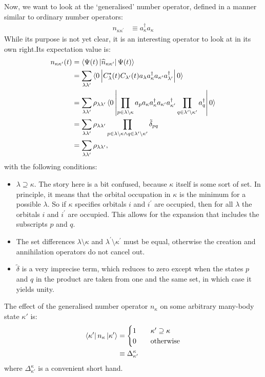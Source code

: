 Now, we want to look at the `generalised' number operator, defined in a manner similar to ordinary number operators: 
\begin{align}
n_{\kappa\kappa^\prime} &\equiv a^\dagger_\kappa a_\kappa \label{eq:gennum}
\end{align}
While its purpose is not yet clear, it is an interesting operator to look at in its own right.Its expectation value is:
\begin{align*}
n_{\kappa\kappa^\prime} (t) &= \braket{\Psi (t) \left| \widehat{n}_{\kappa\kappa^\prime}\right|\Psi (t)} \\
&=\sum_{\lambda\lambda^\prime} \braket{0\left| C_\lambda^\star (t) C_{\lambda^\prime} (t) a_\lambda a_\kappa^\dagger a_{\kappa^\prime} a_{\lambda^\prime}^\dagger \right|0}
\\
&= \sum_{\lambda\lambda^\prime} \rho_{\lambda\lambda^\prime} \braket{0\left| \prod_{p \in \lambda\setminus{\kappa}} a_p a_\kappa a_\kappa^\dagger a_{\kappa^\prime} a_{\kappa^\prime}^\dagger \prod_{q \in \lambda^\prime\setminus{\kappa^\prime}}a_q^\dagger \right|0}
\\
&= \sum_{\lambda\lambda^\prime} \rho_{\lambda\lambda^\prime} \prod_{p \in \lambda\setminus{\kappa} \wedge q \in \lambda^\prime\setminus{\kappa^\prime}} \tilde{\delta}_{pq}
\\
&=  \sum_{\lambda\lambda^\prime} \rho_{\lambda\lambda^\prime},
\end{align*}with the following conditions:
\begin{itemize}
\item $\lambda\supseteq\kappa$. The story here is a bit confused, because $\kappa$ itself is some sort of set. In principle, it means that the orbital occupation in $\kappa$ is the minimum for a possible $\lambda$. So if $\kappa$ specifies orbitals $i$ and $i^\prime$ are occupied, then for all $\lambda$ the orbitals $i$ and $i^\prime$ are occupied. This allows for the expansion that includes the subscripts $p$ and $q$.
\item The set differences $\lambda\setminus{\kappa}$ and $\lambda^\prime\setminus{\kappa^\prime}$ must be equal, otherwise the creation and annihilation operators do not cancel out. 
\item $\tilde{\delta}$ is a very imprecise term, which reduces to zero except when the states $p$ and $q$ in the product are taken from one and the same set, in which case it yields unity.
\end{itemize}

The effect of the generalised number operator $n_\kappa$ on some arbitrary many-body state $\kappa'$ is:
\begin{align}
\bra{\kappa'} n_\kappa \ket{\kappa'} &= \begin{cases} 1 &\quad \kappa'\supseteq\kappa \\
0 & \quad \text{otherwise} \end{cases}
\label{eq:generalisednumberoperator}\\
&\equiv \Delta^{\kappa}_{\kappa'}\nonumber
\end{align}
where $\Delta^{\kappa}_{\kappa'}$ is a convenient short hand.

